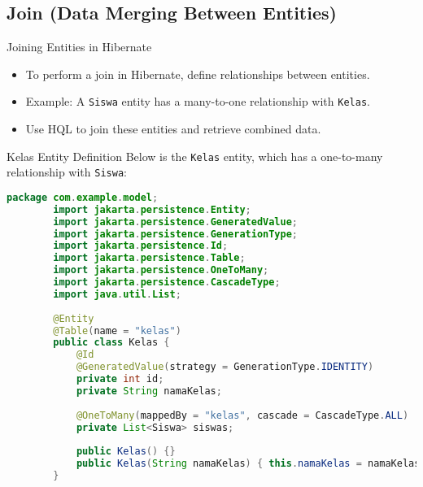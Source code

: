 \documentclass[aspectratio=169, table]{beamer}
\begin{document}
\subsection{Join (Data Merging Between Entities)}

\begin{frame}{Joining Entities in Hibernate}
	\vspace{20pt}
	\begin{itemize}
		\item To perform a join in Hibernate, define relationships between entities.
		\item Example: A \texttt{Siswa} entity has a many-to-one relationship with \texttt{Kelas}.
		\item Use HQL to join these entities and retrieve combined data.
	\end{itemize}
\end{frame}

\begin{frame}[fragile]{Kelas Entity Definition}
	\vspace{20pt}
	Below is the \texttt{Kelas} entity, which has a one-to-many relationship with \texttt{Siswa}:
	
	\begin{lstlisting}[language=Java, style=JavaStyle]
		package com.example.model;
		import jakarta.persistence.Entity;
		import jakarta.persistence.GeneratedValue;
		import jakarta.persistence.GenerationType;
		import jakarta.persistence.Id;
		import jakarta.persistence.Table;
		import jakarta.persistence.OneToMany;
		import jakarta.persistence.CascadeType;
		import java.util.List;
		
		@Entity
		@Table(name = "kelas")
		public class Kelas {
			@Id
			@GeneratedValue(strategy = GenerationType.IDENTITY)
			private int id;
			private String namaKelas;
			
			@OneToMany(mappedBy = "kelas", cascade = CascadeType.ALL)
			private List<Siswa> siswas;
			
			public Kelas() {}
			public Kelas(String namaKelas) { this.namaKelas = namaKelas; }
		}
	\end{lstlisting}
\end{frame}
\end{document}
